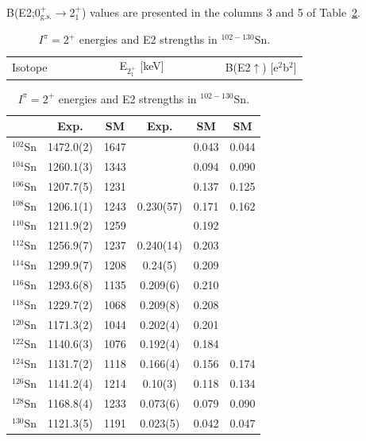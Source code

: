 \documentclass[prc,twocolumn,amssymb,amsmath,showpacs,superscriptaddress]{revtex4}
\begin{document}
B(E2;0$^+_{\text{g.s.}}$$\to$2$^+_1$) values are presented in the
columns 3 and 5 of Table~\ref{tab-2}.
\begin{table}[htb]
\caption{$I^\pi=2^+$ energies and E2 strengths in
$^{102-130}$Sn.}\label{tab-2}
\begin{tabular}[t]{llrll}
\hline \hline
\vspace{5pt}
Isotope&~~~~~~~~~& E$_{2^{+}_{1}}$ [keV] & ~~~~~~~& B(E2$\uparrow$) [e$^2$b$^2$]   \\
\end{tabular}
\begin{tabular}{cccccc}
           & Exp.\footnotemark[1] & SM\footnotemark[2] & Exp. & SM\footnotemark[2]&
SM\footnotemark[3]   \\
\hline \hline
$^{102}$Sn & 1472.0(2) & 1647 & & 0.043 &0.044  \\
$^{104}$Sn & 1260.1(3) & 1343 & & 0.094 &  0.090\\
$^{106}$Sn & 1207.7(5) & 1231 & & 0.137 & 0.125 \\
$^{108}$Sn & 1206.1(1) & 1243 & 0.230(57)\footnotemark[4] & 0.171 &0.162  \\
$^{110}$Sn & 1211.9(2) & 1259 & & 0.192   &\\
$^{112}$Sn & 1256.9(7) & 1237 & 0.240(14)\footnotemark[1] & 0.203&   \\
$^{114}$Sn & 1299.9(7) & 1208 & 0.24(5)\footnotemark[1] & 0.209  & \\
$^{116}$Sn & 1293.6(8) & 1135 & 0.209(6)\footnotemark[1] & 0.210 & \\
$^{118}$Sn & 1229.7(2) & 1068 & 0.209(8)\footnotemark[1] & 0.208  & \\
$^{120}$Sn & 1171.3(2) & 1044 & 0.202(4)\footnotemark[1] & 0.201  & \\
$^{122}$Sn & 1140.6(3) & 1076 & 0.192(4)\footnotemark[1] & 0.184  & \\
$^{124}$Sn & 1131.7(2) & 1118 & 0.166(4)\footnotemark[1] & 0.156  & 0.174\\
$^{126}$Sn & 1141.2(4) & 1214 & 0.10(3)\footnotemark[5] & 0.118   &0.134\\
$^{128}$Sn & 1168.8(4) & 1233 & 0.073(6)\footnotemark[5] & 0.079  & 0.090\\
$^{130}$Sn & 1121.3(5) & 1191 & 0.023(5)\footnotemark[5] & 0.042  &0.047 \\
\hline \hline
\end{tabular}
 
 
\end{table}
\end{document}
